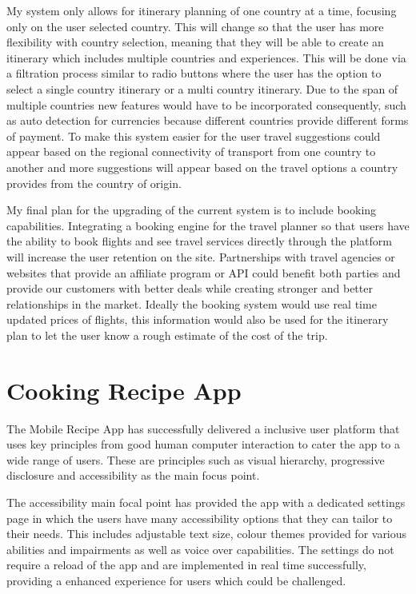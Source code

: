 \documentclass[]{project_final}
\begin{document}
My system only allows for itinerary planning of one country at a time, focusing only on the user selected country. This will change so that the user has more flexibility with country selection, meaning that they will be able to create an itinerary which includes multiple countries and experiences. This will be done via a filtration process similar to radio buttons where the user has the option to select a single country itinerary or a multi country itinerary. Due to the span of multiple countries new features would have to be incorporated consequently, such as auto detection for currencies because different countries provide different forms of payment.
To make this system easier for the user travel suggestions could appear based on the regional connectivity of transport from one country to another and more suggestions will appear based on the travel options a country provides from the country of origin.

My final plan for the upgrading of the current system is to include booking capabilities. Integrating a booking engine for the travel planner so that users have the ability to book flights and see travel services directly through the platform will increase the user retention on the site.
Partnerships with travel agencies or websites that provide an affiliate program or API could benefit both parties and provide our customers with better deals while creating stronger and better relationships in the market.
Ideally the booking system would use real time updated prices of flights, this information would also be used for the itinerary plan to let the user know a rough estimate of the cost of the trip.

\section{Cooking Recipe App}
The Mobile Recipe App has successfully delivered a inclusive user platform that uses key principles from good human computer interaction to cater the app to a wide range of users. These are principles such as visual hierarchy, progressive disclosure and accessibility as the main focus point.

The accessibility main focal point has provided the app with a dedicated settings page in which the users have many accessibility options that they can tailor to their needs. This includes adjustable text size, colour themes provided for various abilities and impairments as well as voice over capabilities. The settings do not require a reload of the app and are implemented in real time successfully, providing a enhanced experience for users which could be challenged.
\end{document}
